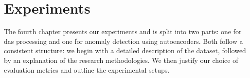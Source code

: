 \chapter{Experiments}
\label{chap:exp}

The fourth chapter presents our experiments and is split into two parts: one for \acrshort{das} processing and one for anomaly detection using autoencoders. Both follow a consistent structure: we begin with a detailed description of the dataset, followed by an explanation of the research methodologies. We then justify our choice of evaluation metrics and outline the experimental setups.


\clearpage


